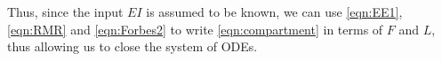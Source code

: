 Thus, since the input $EI$ is assumed to be known, we can use \eqref{eqn:EE1}, \eqref{eqn:RMR} and \eqref{eqn:Forbes2} to write \eqref{eqn:compartment} in terms of $F$ and $L$, thus allowing us to close the system of ODEs.

